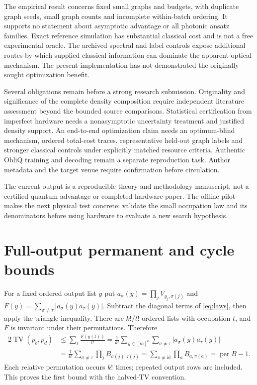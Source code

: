 \documentclass[11pt,a4paper]{article}
\theoremstyle{remark}\newtheorem{remark}[theorem]{Remark}
\DeclareMathOperator{\TV}{TV}
\DeclareMathOperator{\per}{per}
\begin{document}
The empirical result concerns fixed small graphs and budgets, with duplicate graph seeds, small graph counts and incomplete within-batch ordering. It supports no statement about asymptotic advantage or all photonic ansatz families. Exact reference simulation has substantial classical cost and is not a free experimental oracle. The archived spectral and label controls expose additional routes by which supplied classical information can dominate the apparent optical mechanism. The present implementation has not demonstrated the originally sought optimization benefit.

Several obligations remain before a strong research submission. Originality and significance of the complete density composition require independent literature assessment beyond the bounded source comparisons. Statistical certification from imperfect hardware needs a nonasymptotic uncertainty treatment and justified density support. An end-to-end optimization claim needs an optimum-blind mechanism, ordered total-cost traces, representative held-out graph labels and stronger classical controls under explicitly matched resource criteria. Authentic ObliQ training and decoding remain a separate reproduction task. Author metadata and the target venue require confirmation before circulation.

The current output is a reproducible theory-and-methodology manuscript, not a certified quantum-advantage or completed hardware paper. The offline pilot makes the next physical test concrete: validate the small occupation law and its denominators before using hardware to evaluate a new search hypothesis.



\appendix
\section{Full-output permanent and cycle bounds}\label{app:gram}
For a fixed ordered output list $y$ put $a_\sigma(y)=\prod_jV_{y_j,\sigma(j)}$ and $F(y)=\sum_{\sigma\ne\tau}|a_\sigma(y)a_\tau(y)|$. Subtract the diagonal terms of \cref{eq:laws}, then apply the triangle inequality. There are $k!/t!$ ordered lists with occupation $t$, and $F$ is invariant under their permutations. Therefore
\begin{align}
 2\TV(p_b,p_d)&\le\sum_t\frac{F(y(t))}{t!}
 =\frac1{k!}\sum_{y\in[m]^k}\sum_{\sigma\ne\tau}|a_\sigma(y)a_\tau(y)|\nonumber\\
 &=\frac1{k!}\sum_{\sigma\ne\tau}\prod_j B_{\sigma(j),\tau(j)}
 =\sum_{\pi\ne\mathrm{id}}\prod_a B_{a,\pi(a)}=\per B-1.
\end{align}
Each relative permutation occurs $k!$ times; repeated output rows are included. This proves the first bound with the halved-TV convention.
\end{document}
